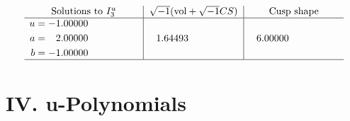\documentclass[1p]{elsarticle_modified}
\theoremstyle{definition}
\newcommand{\I}{\sqrt{-1}}
\begin{document}
$$\begin{array}{c|c|c}  
\text{Solutions to }I^u_{3}& \I (\text{vol} + \sqrt{-1}CS) & \text{Cusp shape}\\
 \hline 
\begin{aligned}
u &= -1.00000\phantom{ +0.000000I} \\
a &= \phantom{-}2.00000\phantom{ +0.000000I} \\
b &= -1.00000\phantom{ +0.000000I}\end{aligned}
 & \phantom{-}1.64493\phantom{ +0.000000I} & \phantom{-}6.00000\phantom{ +0.000000I}\\
 \hline 
 \end{array}$$\newpage
\newpage\renewcommand{\arraystretch}{1}
\centering \section*{ IV. u-Polynomials}
\end{document}
